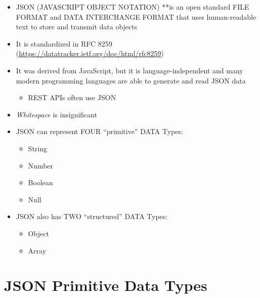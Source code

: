 \begin{itemize}
\item
  JSON (JAVASCRIPT OBJECT NOTATION) **is an open standard FILE FORMAT
  and DATA INTERCHANGE FORMAT that uses human-readable text to store and
  transmit data objects
\item
  It is standardized in RFC 8259
  (\url{https://datatracker.ietf.org/doc/html/rfc8259})
\item
  It was derived from JavaScript, but it is language-independent and
  many modern programming languages are able to generate and read JSON
  data

  \begin{itemize}
  \tightlist
  \item
    REST APIs often use JSON
  \end{itemize}
\item
  \emph{Whitespace} is insignificant
\item
  JSON can represent FOUR ``primitive'' DATA Types:

  \begin{itemize}
  \tightlist
  \item
    String
  \item
    Number
  \item
    Boolean
  \item
    Null
  \end{itemize}
\item
  JSON also has TWO ``structured'' DATA Types:

  \begin{itemize}
  \tightlist
  \item
    Object
  \item
    Array
  \end{itemize}
\end{itemize}

\section{JSON Primitive Data Types}\label{json-primitive-data-types}

